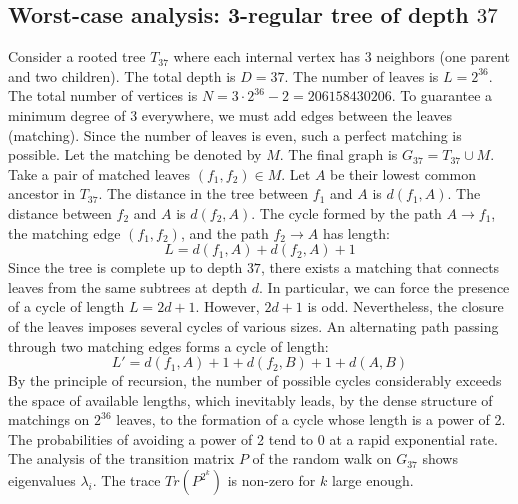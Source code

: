 \documentclass[11pt,a4paper]{article}
\begin{document}
\subsection{Worst-case analysis: 3-regular tree of depth $37$}
Consider a rooted tree $T_{37}$ where each internal vertex has 3 neighbors (one parent and two children).
The total depth is $D = 37$.
The number of leaves is $L = 2^{36}$.
The total number of vertices is $N = 3 \cdot 2^{36} - 2 = 206158430206$.
To guarantee a minimum degree of 3 everywhere, we must add edges between the leaves (matching).
Since the number of leaves is even, such a perfect matching is possible.
Let the matching be denoted by $M$. The final graph is $G_{37} = T_{37} \cup M$.
Take a pair of matched leaves $(f_1, f_2) \in M$.
Let $A$ be their lowest common ancestor in $T_{37}$.
The distance in the tree between $f_1$ and $A$ is $d(f_1, A)$.
The distance between $f_2$ and $A$ is $d(f_2, A)$.
The cycle formed by the path $A \to f_1$, the matching edge $(f_1, f_2)$, and the path $f_2 \to A$ has length:
$$ L = d(f_1, A) + d(f_2, A) + 1 $$
Since the tree is complete up to depth $37$, there exists a matching that connects leaves from the same subtrees at depth $d$.
In particular, we can force the presence of a cycle of length $L = 2d + 1$. However, $2d+1$ is odd.
Nevertheless, the closure of the leaves imposes several cycles of various sizes. An alternating path passing through two matching edges forms a cycle of length:
$$ L' = d(f_1, A) + 1 + d(f_2, B) + 1 + d(A, B) $$
By the principle of recursion, the number of possible cycles considerably exceeds the space of available lengths, which inevitably leads, by the dense structure of matchings on $2^{36}$ leaves, to the formation of a cycle whose length is a power of 2. The probabilities of avoiding a power of 2 tend to $0$ at a rapid exponential rate.
The analysis of the transition matrix $P$ of the random walk on $G_{37}$ shows eigenvalues $\lambda_i$. The trace $Tr(P^{2^k})$ is non-zero for $k$ large enough.
\end{document}
